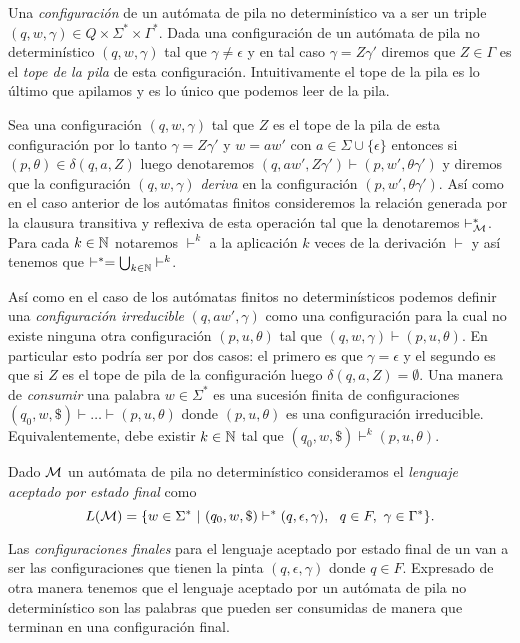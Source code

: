 \documentclass[tesis.tex]{subfiles}
\begin{document}
Una \emph{configuración} de un autómata de pila no determinístico va a ser un triple $(q,w,\gamma) \in Q \times \Sigma^* \times \Gamma^*$.
Dada una configuración de un autómata de pila no determinístico $(q,w, \gamma)$
tal que $\gamma \neq \epsilon$ y en tal caso $\gamma = Z \gamma'$ diremos que $Z \in \Gamma$ es el \emph{tope de la pila} de esta configuración.
Intuitivamente el tope de la pila es lo último que apilamos y es lo único que podemos leer de la pila.

Sea una configuración $(q,w,\gamma)$ tal que $Z$ es el tope de la pila de esta configuración por lo tanto $\gamma = Z \gamma'$ y $w = aw'$ con $a \in \Sigma \cup \{\epsilon\}$ 
entonces si $(p,\theta) \in \delta(q,a,Z)$ luego denotaremos $(q,aw', Z\gamma') \vdash (p,w',\theta\gamma')$ y diremos que la configuración $(q,w,\gamma)$ \emph{deriva} en la configuración $(p,w',\theta\gamma')$.
Así como en el caso anterior de los autómatas finitos consideremos la relación generada por la clausura transitiva y reflexiva de esta operación tal que la denotaremos $\vdash^*_{\cal M}$.
Para cada $k \in \mathbb{N}$ notaremos $\vdash^k$ a la aplicación $k$ veces de la derivación $\vdash$ y así tenemos que $\vdash^* = \bigcup_{k \in \mathbb{N}} \vdash^k$.


Así como en el caso de los autómatas finitos no determinísticos podemos definir una \emph{configuración irreducible} $(q,aw',\gamma)$ como una configuración para la cual no existe ninguna otra configuración $(p,u,\theta)$ tal que $(q,w,\gamma) \vdash (p,u,\theta)$.
En particular esto podría ser por dos casos: el primero es que $\gamma = \epsilon$ y el segundo es que si $Z$ es el tope de pila de la configuración luego $\delta(q,a,Z) = \emptyset$.
Una manera de \emph{consumir} una palabra $w \in \Sigma^*$ es una sucesión finita de configuraciones $(q_{0},w,\$) \vdash \dots \vdash (p,u,\theta)$ donde $(p,u,\theta)$ es una configuración irreducible.
Equivalentemente, debe existir $k \in \mathbb{N}$ tal que $(q_{0},w,\$) \vdash^k (p,u,\theta)$.

\begin{deff}
	Dado $\cal M$ un autómata de pila no determinístico consideramos el \emph{lenguaje aceptado por estado final} como
	\begin{equation*}
		L( {\cal M}) = \{ w \in \Sigma^* \ | \ (q_0,w,\$) \vdash^* (q, \epsilon, \gamma), \ \ q \in F, \ \gamma \in \Gamma^*      \}.
	\end{equation*}
\end{deff}
Las \emph{configuraciones finales} para el lenguaje aceptado por estado final de un \APND van a ser las configuraciones que tienen la pinta $(q,\epsilon,\gamma)$ donde $q \in F$.
Expresado de otra manera tenemos que el lenguaje aceptado por un autómata de pila no determinístico son las palabras que pueden ser consumidas de manera que terminan en una configuración final.
\end{document}
